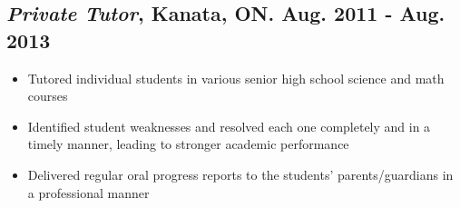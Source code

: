 \documentclass[12pt]{article}
\begin{document}
	\subsection*{\textit{Private Tutor}, Kanata, ON. Aug. 2011 - Aug. 2013}
		\begin{itemize} \vspace{-10pt}
		\item Tutored individual students in various senior high school science and math courses
		\item Identified student weaknesses and resolved each one completely and in a timely manner, leading to stronger academic performance
		\item Delivered regular oral progress reports to the students' parents/guardians in a professional manner
		\end{itemize}
\end{document}
